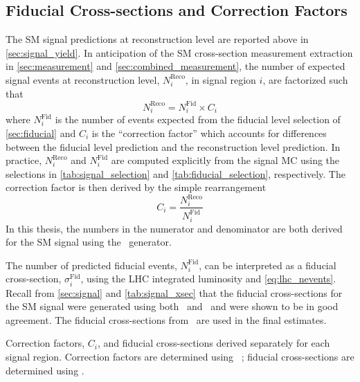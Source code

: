 \subsection{Fiducial Cross-sections and Correction Factors}
\label{sec:inputs}

The SM signal predictions at reconstruction level 
are reported above in \sec\ref{sec:signal_yield}.
In anticipation of the SM cross-section measurement extraction
in \sec\ref{sec:measurement} and \sec\ref{sec:combined_measurement}, 
the number of expected signal events 
at reconstruction level, $N^{\textrm{Reco}}_i$, in signal region $i$,
are factorized such that
\begin{equation}
N^{\textrm{Reco}}_i = N^{\textrm{Fid}}_i \times C_i
\end{equation}
where $N^{\textrm{Fid}}_i$
is the number of events expected from the fiducial
level selection of \sec\ref{sec:fiducial} and 
$C_i$ is the ``correction factor'' which 
accounts for differences between the fiducial level prediction
and the reconstruction level prediction.
In practice, $N^{\textrm{Reco}}_i$ and $N^{\textrm{Fid}}_i$
are computed explicitly from the signal MC using the selections
in \tab\ref{tab:signal_selection} and \tab\ref{tab:fiducial_selection},
respectively.  The correction factor is then derived by the simple rearrangement
\begin{equation}
\label{eq:cfactor}
C_i = \frac{N_i^{\textrm{Reco}}}{N_i^{\textrm{Fid}}}
\end{equation}
In this thesis, the numbers in the numerator and denominator are both derived for the SM
signal using the \vbfnlo~generator.


The number of predicted fiducial events, $N^{\textrm{Fid}}_i$,
can be interpreted as a fiducial cross-section, $\sigma^{\textrm{Fid}}_i$,
using the LHC integrated luminosity and \eqn\eqref{eq:lhc_nevents}.
Recall from \sec\ref{sec:signal} and \tab\ref{tab:signal_xsec}
that the fiducial cross-sections for the SM signal were generated using
both \madgraph~and \vbfnlo~and were shown to be in good agreement.
The fiducial cross-sections from \madgraph~are used in the final
estimates.


\begin{table}[ht!]
\centering

\caption{Correction factors, $C_i$, and fiducial cross-sections derived
separately for each signal region. Correction factors are determined
using \vbfnlo~; fiducial cross-sections are determined
using \madgraph.}
\label{tab:inputs_3l}
\end{table}

